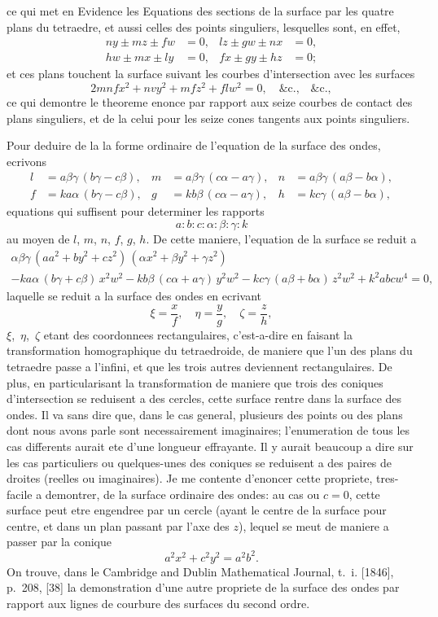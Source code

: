 \documentclass[11pt,a4paper]{book}
\begin{document}
\newpage
ce qui met en Evidence les Equations des sections de la surface par les quatre plans du tetraedre, et aussi celles des points singuliers, lesquelles sont, en effet,
\begin{align*}
ny \pm mz \pm fw &= 0, & lz \pm gw \pm nx &= 0,\\
hw \pm mx \pm ly &= 0, & fx \pm gy \pm hz &= 0;
\end{align*}
et ces plans touchent la surface suivant les courbes d'intersection avec les surfaces
\[
2mnfx^2 + nvy^2 + mfz^2 + flw^2 = 0, \quad \&\text{c.,}\quad \&\text{c.},
\]
ce qui demontre le theoreme enonce par rapport aux seize courbes de contact des plans singuliers, et de la celui pour les seize cones tangents aux points singuliers.

Pour deduire de la la forme ordinaire de l'equation de la surface des ondes, ecrivons
\begin{align*}
l &= a\beta\gamma\,(b\gamma - c\beta), & m &= a\beta\gamma\,(c\alpha - a\gamma), & n &= a\beta\gamma\,(a\beta - b\alpha),\\
f &= ka\alpha\,(b\gamma - c\beta), & g &= kb\beta\,(c\alpha - a\gamma), & h &= kc\gamma\,(a\beta - b\alpha),
\end{align*}
equations qui suffisent pour determiner les rapports
\[
a : b : c : \alpha : \beta : \gamma : k
\]
au moyen de $l$, $m$, $n$, $f$, $g$, $h$. De cette maniere, l'equation de la surface se reduit a
\begin{multline*}
\alpha\beta\gamma\,(aa^2 + by^2 + cz^2)\,(\alpha x^2 + \beta y^2 + \gamma z^2) \\
- ka\alpha\,(b\gamma + c\beta)\,x^2w^2 - kb\beta\,(c\alpha + a\gamma)\,y^2w^2 - kc\gamma\,(a\beta + b\alpha)\,z^2w^2 + k^2abcw^4 = 0,
\end{multline*}
laquelle se reduit a la surface des ondes en ecrivant
\[
\xi = \frac{x}{f}, \quad \eta = \frac{y}{g}, \quad \zeta = \frac{z}{h},
\]
$\xi$,~$\eta$,~$\zeta$ etant des coordonnees rectangulaires, c'est-a-dire en faisant la transformation homographique du tetraedroide, de maniere que l'un des plans du tetraedre passe a l'infini, et que les trois autres deviennent rectangulaires. De plus, en particularisant la transformation de maniere que trois des coniques d'intersection se reduisent a des cercles, cette surface rentre dans la surface des ondes. Il va sans dire que, dans le cas general, plusieurs des points ou des plans dont nous avons parle sont necessairement imaginaires; l'enumeration de tous les cas differents aurait ete d'une longueur effrayante. Il y aurait beaucoup a dire sur les cas particuliers ou quelques-unes des coniques se reduisent a des paires de droites (reelles ou imaginaires). Je me contente d'enoncer cette propriete, tres-facile a demontrer, de la surface ordinaire des ondes: au cas ou $c=0$, cette surface peut etre engendree par un cercle (ayant le centre de la surface pour centre, et dans un plan passant par l'axe des $z$), lequel se meut de maniere a passer par la conique
\[
a^2x^2 + c^2y^2 = a^2b^2.
\]
On trouve, dans le Cambridge and Dublin Mathematical Journal, t.~i. [1846], p.~208, [38] la demonstration d'une autre propriete de la surface des ondes par rapport aux lignes de courbure des surfaces du second ordre.
\end{document}
